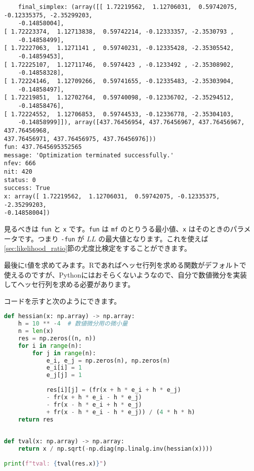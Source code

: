     \begin{lstlisting}
    final_simplex: (array([[ 1.72219562,  1.12706031,  0.59742075, -0.12335375, -2.35299203,
    -0.14858004],
[ 1.72223374,  1.12713838,  0.59742214, -0.12333357, -2.3530793 ,
    -0.14858499],
[ 1.72227063,  1.1271141 ,  0.59740231, -0.12335428, -2.35305542,
    -0.14859453],
[ 1.72225107,  1.12711746,  0.5974423 , -0.1233492 , -2.35308902,
    -0.14858328],
[ 1.72224146,  1.12709266,  0.59741655, -0.12335483, -2.35303904,
    -0.14858497],
[ 1.72219851,  1.12702764,  0.59740098, -0.12336702, -2.35294512,
    -0.14858476],
[ 1.72224552,  1.12706853,  0.59744533, -0.12336778, -2.35304103,
    -0.14858999]]), array([437.76456954, 437.76456967, 437.76456967, 437.76456968,
437.76456971, 437.76456975, 437.76456976]))
fun: 437.7645695352565
message: 'Optimization terminated successfully.'
nfev: 666
nit: 420
status: 0
success: True
x: array([ 1.72219562,  1.12706031,  0.59742075, -0.12335375, -2.35299203,
-0.14858004])
\end{lstlisting}
    
    見るべきは \lstinline{fun} と \lstinline{x} です。\lstinline{fun} は \lstinline{mf} のとりうる最小値、\lstinline{x} はそのときのパラメータです。つまり \lstinline{-fun} が $LL$ の最大値となります。これを使えば\ref{sec:likelihood_ratio}節の尤度比検定をすることができます。
    
    最後にt値を求めてみます。Rであればヘッセ行列を求める関数がデフォルトで使えるのですが、Pythonにはおそらくないようなので、自分で数値微分を実装してヘッセ行列を求める必要があります。
    
    コードを示すと次のようにできます。
    
    \begin{lstlisting}[caption=t値計算,language=Python]
def hessian(x: np.array) -> np.array:
    h = 10 ** -4  # 数値微分用の微小量
    n = len(x)
    res = np.zeros((n, n))
    for i in range(n):
        for j in range(n):
            e_i, e_j = np.zeros(n), np.zeros(n)
            e_i[i] = 1
            e_j[j] = 1
            
            res[i][j] = (fr(x + h * e_i + h * e_j)
            - fr(x + h * e_i - h * e_j)
            - fr(x - h * e_i + h * e_j)
            + fr(x - h * e_i - h * e_j)) / (4 * h * h)
    return res
    
    
def tval(x: np.array) -> np.array:
    return x / np.sqrt(-np.diag(np.linalg.inv(hessian(x))))
    
print(f"tval: {tval(res.x)}")
\end{lstlisting}
    
